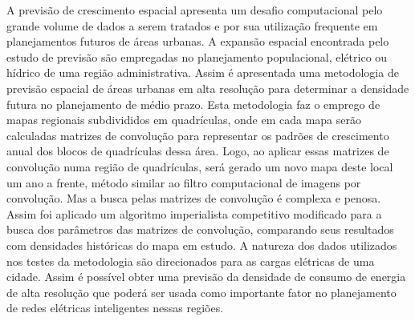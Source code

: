 \setlength{\absparsep}{18pt} %
\begin{resumo}

A previsão de crescimento espacial apresenta um desafio computacional pelo grande volume de dados a serem tratados e por sua utilização frequente em planejamentos futuros de áreas urbanas. A expansão espacial encontrada pelo estudo de previsão são empregadas no planejamento populacional, elétrico ou hídrico de uma região administrativa. Assim é apresentada uma metodologia de previsão espacial de áreas urbanas em alta resolução para determinar a densidade futura no planejamento de médio prazo. Esta metodologia faz o emprego de mapas regionais subdivididos em quadrículas, onde em cada mapa serão calculadas matrizes de convolução para representar os padrões de crescimento anual dos blocos de quadrículas dessa área. Logo, ao aplicar essas matrizes de convolução numa região de quadrículas, será gerado um novo mapa deste local um ano a frente, método similar ao filtro computacional de imagens por convolução. Mas a busca pelas matrizes de convolução é complexa e penosa. Assim foi aplicado um algoritmo imperialista competitivo modificado para a busca dos parâmetros das matrizes de convolução, comparando seus resultados com densidades históricas do mapa em estudo. A natureza dos dados utilizados nos testes da metodologia são direcionados para as cargas elétricas de uma cidade. Assim é possível obter uma previsão da densidade de consumo de energia de alta resolução que poderá ser usada como importante fator no planejamento de redes elétricas inteligentes nessas regiões. 

\end{resumo}

